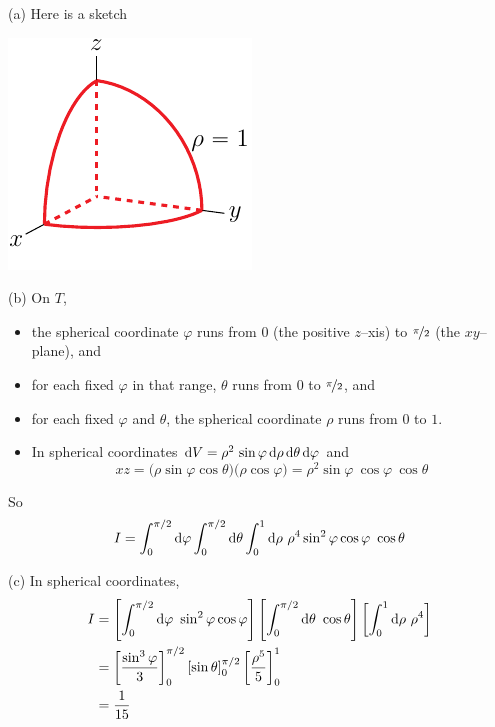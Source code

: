\begin{solution}
(a) Here is a sketch
\begin{center}
     \includegraphics{fig/OE08D_8.pdf}
\end{center}


(b) On $T$,
\begin{itemize}
\item
the spherical coordinate $\varphi$ runs from $0$ (the positive $z$--xis)
to $\nicefrac{\pi}{2}$ (the $xy$--plane), and
\item 
for each fixed $\varphi$ in that range,
$\theta$ runs from $0$ to $\nicefrac{\pi}{2}$, and
\item
for each fixed $\varphi$ and $\theta$, the spherical coordinate
$\rho$ runs from $0$ to $1$.
\item
In spherical coordinates 
  $\mathrm{d}V=\rho^2\,\sin\varphi\,\mathrm{d}\rho\,\mathrm{d}\theta\, \mathrm{d}\varphi$
and
\begin{equation*}
   xz=\big(\rho\sin\varphi\cos\theta\big)\big(\rho\cos\varphi\big)
      =\rho^2 \sin\varphi\ \cos\varphi\ \cos\theta
\end{equation*}
\end{itemize}
So
\begin{align*}
I=\int_0^{\pi/2}\dee{\varphi}\int_0^{\pi/2}\dee{\theta}\int_0^1\dee{\rho}\ 
         \rho^4\sin^2\varphi\cos\varphi\ \cos\theta
\end{align*} 

(c) In spherical coordinates,
\begin{align*}
I&=  \left[\int_0^{\pi/2}\dee{\varphi}\ \sin^2\varphi\cos\varphi\right]
    \left[\int_0^{\pi/2}\dee{\theta}\ \cos\theta\right]
     \left[\int_0^1\dee{\rho}\ \rho^4\right] \\
 &=\left[\frac{\sin^3\varphi}{3}\right]_0^{\pi/2}
    \left[\sin\theta\right]_0^{\pi/2}
     \left[\frac{\rho^5}{5}\right]_0^1 \\
 &=\frac{1}{15}
\end{align*}
\end{solution}


